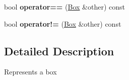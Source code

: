 \begin{DoxyCompactItemize}
\item 
\hypertarget{class_box_a7c8e97a121dbcd13979d2b88c69d5c96}{bool {\bfseries operator==} (\hyperlink{class_box}{Box} \&other) const }\label{class_box_a7c8e97a121dbcd13979d2b88c69d5c96}

\item 
\hypertarget{class_box_aefd421e75c7ae21707c7ac71579f7079}{bool {\bfseries operator!=} (\hyperlink{class_box}{Box} \&other) const }\label{class_box_aefd421e75c7ae21707c7ac71579f7079}

\end{DoxyCompactItemize}


\subsection{Detailed Description}
Represents a box 

